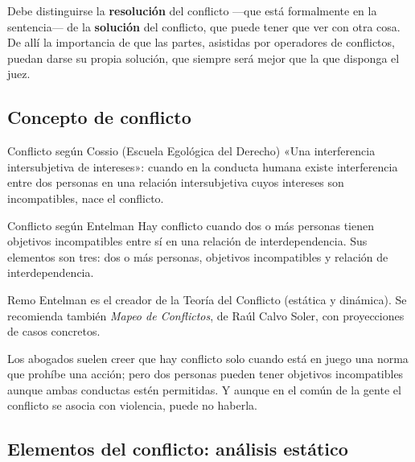 \documentclass[12pt,oneside]{book}
\begin{document}
\begin{important}
Debe distinguirse la \textbf{resolución} del conflicto ---que está formalmente en la sentencia--- de la \textbf{solución} del conflicto, que puede tener que ver con otra cosa. De allí la importancia de que las partes, asistidas por operadores de conflictos, puedan darse su propia solución, que siempre será mejor que la que disponga el juez.
\end{important}

\subsection{Concepto de conflicto}

\begin{definition}{Conflicto según Cossio (Escuela Egológica del Derecho)}
«Una interferencia intersubjetiva de intereses»: cuando en la conducta humana existe interferencia entre dos personas en una relación intersubjetiva cuyos intereses son incompatibles, nace el conflicto.
\end{definition}

\begin{definition}{Conflicto según Entelman}
Hay conflicto cuando dos o más personas tienen objetivos incompatibles entre sí en una relación de interdependencia. Sus elementos son tres: dos o más personas, objetivos incompatibles y relación de interdependencia.
\end{definition}

Remo Entelman es el creador de la Teoría del Conflicto (estática y dinámica). Se recomienda también \textit{Mapeo de Conflictos}, de Raúl Calvo Soler, con proyecciones de casos concretos.

Los abogados suelen creer que hay conflicto solo cuando está en juego una norma que prohíbe una acción; pero dos personas pueden tener objetivos incompatibles aunque ambas conductas estén permitidas. Y aunque en el común de la gente el conflicto se asocia con violencia, puede no haberla.

\subsection{Elementos del conflicto: análisis estático}
\end{document}
